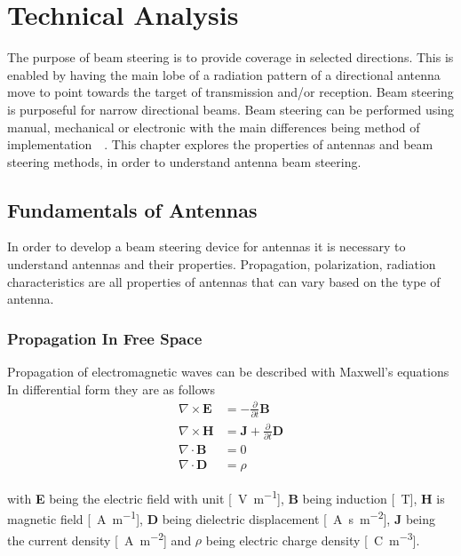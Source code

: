 \chapter{Technical Analysis}
The purpose of beam steering is to provide coverage in selected directions. This is enabled by having the main lobe of a radiation pattern of a directional antenna move to point towards the target of transmission and/or reception. Beam steering is purposeful for narrow directional beams. Beam steering can be performed using manual, mechanical or electronic with the main differences being method of implementation~\cite{ieee_beam_steering}~\cite{ieee_microchip_beam_steering}. This chapter explores the properties of antennas and beam steering methods, in order to understand antenna beam steering.

\section{Fundamentals of Antennas}
In order to develop a beam steering device for antennas it is necessary to understand antennas and their properties. Propagation, polarization, radiation characteristics are all properties of antennas that can vary based on the type of antenna.

\subsection{Propagation In Free Space}
Propagation of electromagnetic waves can be described with Maxwell's equations In differential form they are as follows~\cite[p. 1]{ant_beam_form}
\begin{equation}
    \begin{split}
        \nabla \times \textbf{E} & = - \frac{\partial }{\partial t} \textbf{B} \\
        \nabla \times \textbf{H} & = \textbf{J} + \frac{\partial }{\partial t} \textbf{D} \\
        \nabla \cdot \textbf{B} & = 0 \\
        \nabla \cdot \textbf{D} & = \rho
    \end{split}
\end{equation}

with \textbf{E} being the electric field with unit [\SI{}{\volt\per\meter}], \textbf{B} being induction [\SI{}{\tesla}], \textbf{H} is magnetic field [\SI{}{\ampere\per\meter}], \textbf{D} being dielectric displacement [\SI{}{\ampere\second\per\meter\squared}], \textbf{J} being the current density [\SI{}{\ampere\per\meter\squared}] and $\rho$ being electric charge density [\SI{}{\coulomb\per\meter\cubed}].

